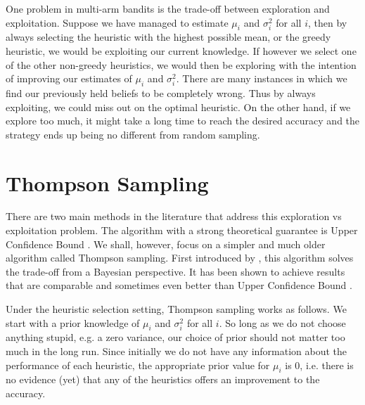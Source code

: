 One problem in multi-arm bandits is the trade-off between exploration and exploitation.
 Suppose we have managed to estimate $\mu_i$ and $\sigma_i^2$
for all $i$, then by always selecting the heuristic with the highest possible mean, or the greedy
heuristic, we would be exploiting our current knowledge. If however we select one of the other
non-greedy heuristics, we would then be exploring with the intention of improving our estimates of
$\mu_i$ and $\sigma_i^2$. There are many instances in which we find our previously held beliefs to
be completely wrong. Thus by always exploiting, we could miss out on the optimal heuristic. On the
other hand, if we explore too much, it might take a long time to reach the desired accuracy and the
strategy ends up being no different from random sampling.

\section{Thompson Sampling} 
\label{sec:thompson}

There are two main methods in the literature that address this exploration vs exploitation problem.
The algorithm with a strong theoretical guarantee is Upper Confidence Bound \cite{auer02}. We
shall, however, focus on a simpler and much older algorithm called Thompson sampling. First
introduced by , this algorithm solves the trade-off from a Bayesian perspective.
It has been shown to achieve results that are comparable and sometimes even better than Upper
Confidence Bound \cite{chapelle11}.

Under the heuristic selection setting, Thompson sampling works as follows. We start with a prior
knowledge of $\mu_i$ and $\sigma_i^2$ for all $i$. So long as we do not choose anything stupid,
e.g. a zero variance, our choice of prior should not matter too much in the long run. Since
initially we do not have any information about the performance of each heuristic, the appropriate
prior value for $\mu_i$ is $0$, i.e. there is no evidence (yet) that any of the heuristics offers an
improvement to the accuracy.

